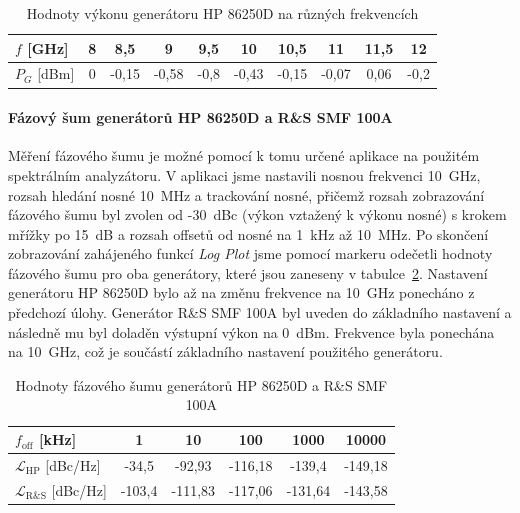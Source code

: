 \documentclass[11pt,a4paper]{article}
\begin{document}
\begin{table}[!ht]
\begin{center}
\begin{tabular}{| l || c | c | c | c | c | c | c | c | c |}
    \hline
    $f$ [GHz] & 8 & 8,5 & 9 & 9,5 & 10 & 10,5 & 11 & 11,5 & 12 \\
    \hline
    $P_G$ [dBm] & 0 & -0,15 & -0,58 & -0,8 & -0,43 & -0,15 & -0,07 & 0,06 & -0,2 \\
    \hline
\end{tabular}
\caption{Hodnoty výkonu generátoru HP 86250D na různých frekvencích}
\label{table:stability-HP}
\end{center}
\end{table}

\paragraph*{Fázový šum generátorů HP 86250D a R\&S SMF 100A} Měření fázového šumu je možné pomocí k tomu určené aplikace na použitém spektrálním analyzátoru. V aplikaci jsme nastavili nosnou frekvenci 10~GHz, rozsah hledání nosné 10~MHz a trackování nosné, přičemž rozsah zobrazování fázového šumu byl zvolen od -30~dBc (výkon vztažený k výkonu nosné) s krokem mřížky po 15~dB a rozsah offsetů od nosné na 1~kHz až 10~MHz. Po skončení zobrazování zahájeného funkcí \emph{Log Plot} jsme pomocí markeru odečetli hodnoty fázového šumu pro oba generátory, které jsou zaneseny v tabulce~\ref{table:phase-noise-HP-and-RS}. Nastavení generátoru HP 86250D bylo až na změnu frekvence na 10~GHz ponecháno z předchozí úlohy. Generátor R\&S SMF 100A byl uveden do základního nastavení a následně mu byl doladěn výstupní výkon na 0~dBm. Frekvence byla ponechána na 10~GHz, což je součástí základního nastavení použitého generátoru.

\begin{table}[!ht]
\begin{center}
\begin{tabular}{| l || c | c | c | c | c |}
    \hline
    $f_{\mathrm{off}}$ [kHz] & 1 & 10 & 100 & 1000 & 10000 \\
    \hline
    $\mathcal L_{\mathrm{HP}}$ [dBc/Hz] & -34,5 & -92,93 & -116,18 & -139,4 & -149,18 \\
    \hline
    $\mathcal L_{\mathrm{R\&S}}$ [dBc/Hz] & -103,4 & -111,83 & -117,06 & -131,64 & -143,58 \\
    \hline
\end{tabular}
\caption{Hodnoty fázového šumu generátorů HP 86250D a R\&S SMF 100A}
\label{table:phase-noise-HP-and-RS}
\end{center}
\end{table}
\end{document}
